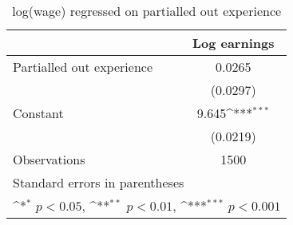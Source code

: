 \begin{table}[htbp]\centering
\def\sym#1{\ifmmode^{#1}\else\(^{#1}\)\fi}
\caption{log(wage) regressed on partialled out experience}
\begin{tabular}{l*{1}{c}}
\hline\hline
                    &\multicolumn{1}{c}{Log earnings}\\
\hline
Partialled out experience&      0.0265         \\
                    &    (0.0297)         \\
[1em]
Constant            &       9.645\sym{***}\\
                    &    (0.0219)         \\
\hline
Observations        &        1500         \\
\hline\hline
\multicolumn{2}{l}{\footnotesize Standard errors in parentheses}\\
\multicolumn{2}{l}{\footnotesize \sym{*} \(p<0.05\), \sym{**} \(p<0.01\), \sym{***} \(p<0.001\)}\\
\end{tabular}
\end{table}
